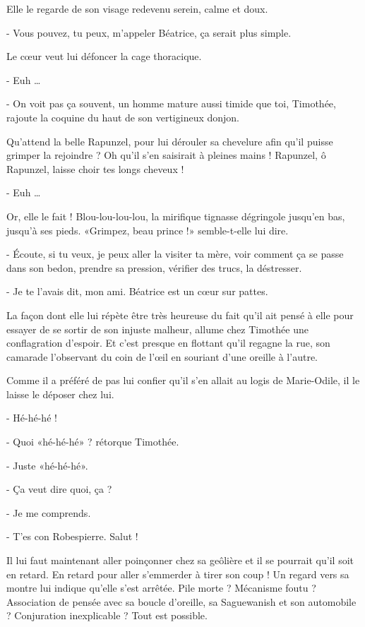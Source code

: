Elle le regarde de son visage redevenu serein, calme et doux.

- Vous pouvez, tu peux, m’appeler Béatrice, ça serait plus simple.

Le cœur veut lui défoncer la cage thoracique.

- Euh …

- On voit pas ça souvent, un homme mature aussi timide que toi, Timothée, rajoute la coquine du haut de son vertigineux donjon.

Qu’attend la belle Rapunzel, pour lui dérouler sa chevelure afin qu’il puisse grimper la rejoindre ? Oh qu’il s’en saisirait à pleines mains ! Rapunzel, ô Rapunzel, laisse choir tes longs cheveux !

- Euh …

Or, elle le fait ! Blou-lou-lou-lou, la mirifique tignasse dégringole jusqu’en bas, jusqu’à ses pieds. «Grimpez, beau prince !» semble-t-elle lui dire.

- Écoute, si tu veux, je peux aller la visiter ta mère, voir comment ça se passe dans son bedon, prendre sa pression, vérifier des trucs, la déstresser.

- Je te l’avais dit, mon ami. Béatrice est un cœur sur pattes.

La façon dont elle lui répète être très heureuse du fait qu’il ait pensé à elle pour essayer de se sortir de son injuste malheur, allume chez Timothée une conflagration d’espoir. Et c’est presque en flottant qu’il regagne la rue, son camarade l’observant du coin de l’œil en souriant d’une oreille à l’autre.

Comme il a préféré de pas lui confier qu’il s’en allait au logis de Marie-Odile, il le laisse le déposer chez lui.

- Hé-hé-hé !

- Quoi «hé-hé-hé» ? rétorque Timothée.

- Juste «hé-hé-hé».

- Ça veut dire quoi, ça ?

- Je me comprends.

- T’es con Robespierre. Salut !

Il lui faut maintenant aller poinçonner chez sa geôlière et il se pourrait qu’il soit en retard. En retard pour aller s’emmerder à tirer son coup ! Un regard vers sa montre lui indique qu’elle s’est arrêtée. Pile morte ? Mécanisme foutu ? Association de pensée avec sa boucle d’oreille, sa Saguewanish et son automobile ? Conjuration inexplicable ? Tout est possible.

